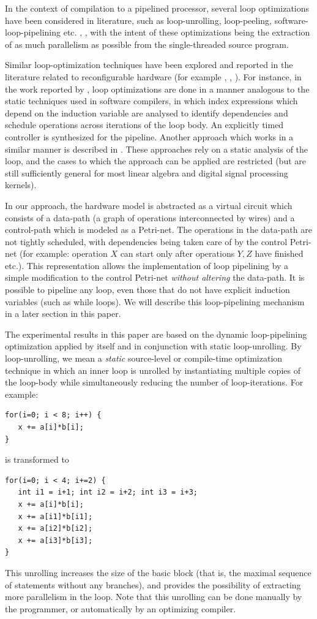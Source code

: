 \documentclass[conference]{IEEEtran}
\begin{document}
In the context of compilation to a pipelined processor, 
several loop optimizations
have been considered in literature, such as loop-unrolling, loop-peeling,
software-loop-pipelining etc. \cite{Wolfe}, \cite{Muchnick}, with the intent of
these optimizations being the extraction of as much
parallelism as possible from the single-threaded source program. 

Similar loop-optimization techniques have been explored and
reported in the literature related to reconfigurable hardware (for
example \cite{WeinhardtLuk}, \cite{Cardoso}, \cite{KastnerPhd}).  For instance,
in the work reported by \cite{WeinhardtLuk},
loop optimizations are done in a manner analogous to the static
techniques used in software compilers, in which index 
expressions which depend on the induction variable
are analysed to identify dependencies and schedule operations
across iterations of the loop body.  An explicitly timed controller is synthesized
for the pipeline.  Another approach which works in a similar
manner is described in \cite{Cardoso}.  These approaches rely on a static analysis of
the loop, and the cases to which the approach can be applied
are restricted (but are still sufficiently general for most linear
algebra and digital signal processing kernels).

In our approach, the hardware model is abstracted as
a virtual circuit which consists of a data-path (a graph of operations 
interconnected by wires) and a control-path
which is modeled as a Petri-net.   The operations in the data-path are
not tightly scheduled, with dependencies being taken care of
by the control Petri-net (for example: operation $X$ can start only
after operations $Y,Z$ have finished etc.). This representation allows the implementation
of loop pipelining by a simple modification to the control Petri-net
{\em without altering} the data-path.  It is possible to pipeline any loop, 
even those that do not have explicit induction variables (such as while loops).  
We will describe this loop-pipelining mechanism in a later section in
this paper.

The experimental results in this paper are based on the dynamic loop-pipelining
optimization applied by itself and in conjunction with static loop-unrolling.
By loop-unrolling, we mean a {\em static} source-level or compile-time optimization technique in
which  an inner loop is unrolled by instantiating multiple copies of the loop-body
while simultaneously reducing the number of loop-iterations.  For example:
\begin{verbatim}
for(i=0; i < 8; i++) {
   x += a[i]*b[i];
}
\end{verbatim}
is transformed to
\begin{verbatim}
for(i=0; i < 4; i+=2) {
   int i1 = i+1; int i2 = i+2; int i3 = i+3;
   x += a[i]*b[i];
   x += a[i1]*b[i1];
   x += a[i2]*b[i2];
   x += a[i3]*b[i3];
}
\end{verbatim}
This unrolling increases the size of the basic block (that is, the maximal sequence of
statements without any branches), and provides the possibility of extracting more
parallelism in the loop.  Note that this unrolling can be done manually
by the programmer, or automatically by an optimizing compiler.
\end{document}
